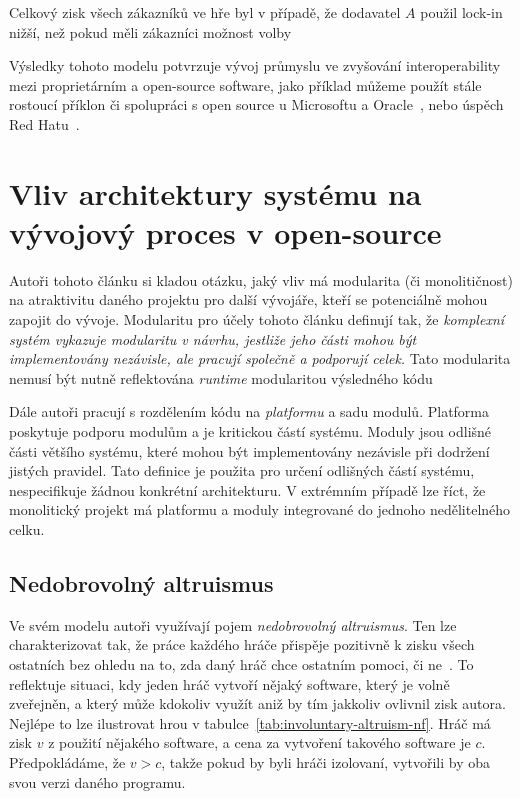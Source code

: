 \begin{multicols}{2}
	Celkový zisk všech zákazníků ve hře byl v případě, že dodavatel $A$ použil lock-in nižší, než pokud měli zákazníci možnost volby~\cite[kap. 5]{lock-in-competition}

	Výsledky tohoto modelu potvrzuje vývoj průmyslu ve zvyšování interoperability mezi proprietárním a open-source software, jako příklad můžeme použít stále rostoucí příklon či spolupráci s open source u Microsoftu a Oracle~\cite[kap. 6]{lock-in-competition}, nebo úspěch Red Hatu~\cite{redhat-growth}.

\section{Vliv architektury systému na vývojový proces v open-source}
\label{ch:architecture-opensource}

	Autoři tohoto článku si kladou otázku, jaký vliv má modularita (či monolitičnost) na atraktivitu daného projektu pro další vývojáře, kteří se potenciálně mohou zapojit do vývoje. Modularitu pro účely tohoto článku definují tak, že {\em komplexní systém vykazuje modularitu v návrhu, jestliže jeho části mohou být implementovány nezávisle, ale pracují společně a podporují celek.} Tato modularita nemusí být nutně reflektována {\em runtime} modularitou výsledného kódu~\cite[kap. 2.1]{architecture-opensource}

	Dále autoři pracují s rozdělením kódu na {\em platformu} a sadu modulů. Platforma poskytuje podporu modulům a je kritickou částí systému. Moduly jsou odlišné části většího systému, které mohou být implementovány nezávisle při dodržení jistých pravidel. Tato definice je použita pro určení odlišných částí systému, nespecifikuje žádnou konkrétní architekturu. V extrémním případě lze říct, že monolitický projekt má platformu a moduly integrované do jednoho nedělitelného celku.

	\subsection*{Nedobrovolný altruismus}
		Ve svém modelu autoři využívají pojem {\em nedobrovolný altruismus}. Ten lze charakterizovat tak, že práce každého hráče přispěje pozitivně k zisku všech ostatních bez ohledu na to, zda daný hráč chce ostatním pomoci, či ne~\cite[kap. 3]{architecture-opensource}. To reflektuje situaci, kdy jeden hráč vytvoří nějaký software, který je volně zveřejněn, a který může kdokoliv využít aniž by tím jakkoliv ovlivnil zisk autora. Nejlépe to lze ilustrovat hrou v tabulce~\ref{tab:involuntary-altruism-nf}. Hráč má zisk $v$ z použití nějakého software, a cena za vytvoření takového software je $c$. Předpokládáme, že $v > c$, takže pokud by byli hráči izolovaní, vytvořili by oba svou verzi daného programu.


\end{multicols}
